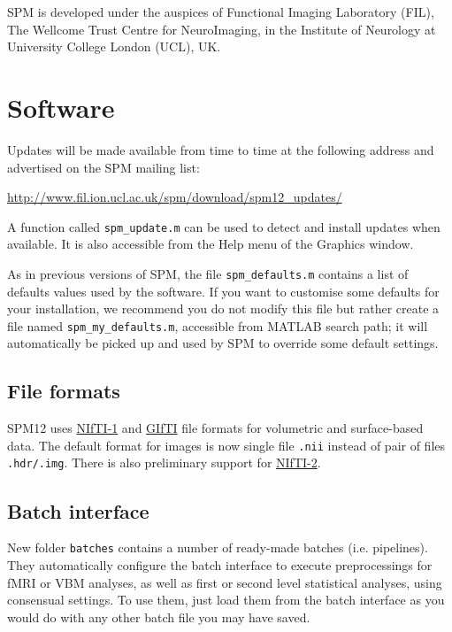 \documentclass[a4paper,titlepage,openany]{article}
\begin{document}
SPM is developed under the auspices of Functional Imaging Laboratory (FIL), The Wellcome Trust Centre for NeuroImaging, in the Institute of Neurology at University College London (UCL), UK.

\vspace{10mm}

\section{Software}
Updates will be made available from time to time at the following address and advertised on the SPM mailing list:

\qquad \url{http://www.fil.ion.ucl.ac.uk/spm/download/spm12_updates/}

A function called \texttt{spm\_update.m} can be used to detect and install updates when available. It is also accessible from the Help menu of the Graphics window.

As in previous versions of SPM, the file \texttt{spm\_defaults.m} contains a list of defaults values used by the software. If you want to customise some defaults for your installation, we recommend you do not modify this file but rather create a file named \texttt{spm\_my\_defaults.m}, accessible from MATLAB search path; it will automatically be picked up and used by SPM to override some default settings.

\subsection{File formats}
SPM12 uses \href{http://nifti.nimh.nih.gov/nifti-1}{NIfTI-1} and \href{http://www.nitrc.org/projects/gifti/}{GIfTI} file formats for volumetric and surface-based data. The default format for images is now single file \texttt{.nii} instead of pair of files \texttt{.hdr/.img}. There is also preliminary support for \href{http://nifti.nimh.nih.gov/nifti-2}{NIfTI-2}. 

\subsection{Batch interface}
New folder \texttt{batches} contains a number of ready-made batches (i.e. pipelines). They automatically configure the batch interface to execute preprocessings for fMRI or VBM analyses, as well as first or second level statistical analyses, using consensual settings. To use them, just load them from the batch interface as you would do with any other batch file you may have saved.
\end{document}
